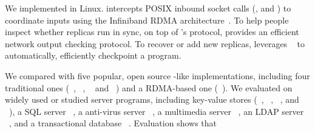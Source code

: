 


We implemented \xxx in Linux. \xxx intercepts POSIX inbound socket calls
(\eg, \accept and \recv) to coordinate inputs using the Infiniband
RDMA architecture~\cite{infiniband}. To help people inspect whether replicas 
run in sync, on top of \xxx's \paxos protocol, \xxx provides an efficient 
network output checking protocol. To recover or add new replicas, \xxx 
leverages \criu~\cite{criu} to automatically, efficiently checkpoint a program.


We compared \xxx with five popular, open source \paxos-like implementations,
including four traditional ones (\libpaxos~\cite{libpaxos},
\zookeeper~\cite{zookeeper}, \crane~\cite{crane:sosp15} and
\spaxos~\cite{spaxos:srds12}) and a RDMA-based one (\dare~\cite{dare:hpdc15}). 
We evaluated \xxx on \nprog widely used or studied server programs, including
\nkvprog key-value stores (\redis~\cite{redis}, \memcached~\cite{memcached},
\ssdb~\cite{ssdb}, and \mongodb~\cite{mongodb}), a SQL server
\mysql~\cite{mysql}, a anti-virus server \clamav~\cite{clamav}, a multimedia
server \mediatomb~\cite{mediatomb}, an LDAP server \openldap~\cite{openldap}, 
and a transactional database \calvin~\cite{calvin:sigmod12}. Evaluation shows 
that

